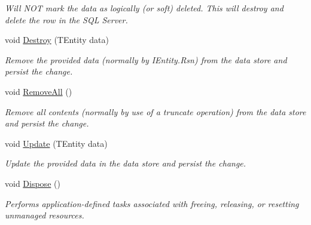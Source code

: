 \begin{DoxyCompactItemize}
\begin{DoxyCompactList}\small\item\em Will N\+OT mark the {\itshape data}  as logically (or soft) deleted. This will destroy and delete the row in the S\+QL Server. \end{DoxyCompactList}\item 
void \hyperlink{classCqrs_1_1Sql_1_1DataStores_1_1SqlDataStore_a5065ed1d4b5c66324afcde4acc68ad6b_a5065ed1d4b5c66324afcde4acc68ad6b}{Destroy} (T\+Entity data)
\begin{DoxyCompactList}\small\item\em Remove the provided {\itshape data}  (normally by I\+Entity.\+Rsn) from the data store and persist the change. \end{DoxyCompactList}\item 
void \hyperlink{classCqrs_1_1Sql_1_1DataStores_1_1SqlDataStore_a5d85a9e627c74a25ef536364a6d60602_a5d85a9e627c74a25ef536364a6d60602}{Remove\+All} ()
\begin{DoxyCompactList}\small\item\em Remove all contents (normally by use of a truncate operation) from the data store and persist the change. \end{DoxyCompactList}\item 
void \hyperlink{classCqrs_1_1Sql_1_1DataStores_1_1SqlDataStore_a5cc26a4d03036f93b5942ff2e04afd2d_a5cc26a4d03036f93b5942ff2e04afd2d}{Update} (T\+Entity data)
\begin{DoxyCompactList}\small\item\em Update the provided {\itshape data}  in the data store and persist the change. \end{DoxyCompactList}\item 
void \hyperlink{classCqrs_1_1Sql_1_1DataStores_1_1SqlDataStore_ac142d009f768519891ca12185a2e6191_ac142d009f768519891ca12185a2e6191}{Dispose} ()
\begin{DoxyCompactList}\small\item\em Performs application-\/defined tasks associated with freeing, releasing, or resetting unmanaged resources. \end{DoxyCompactList}\end{DoxyCompactItemize}
